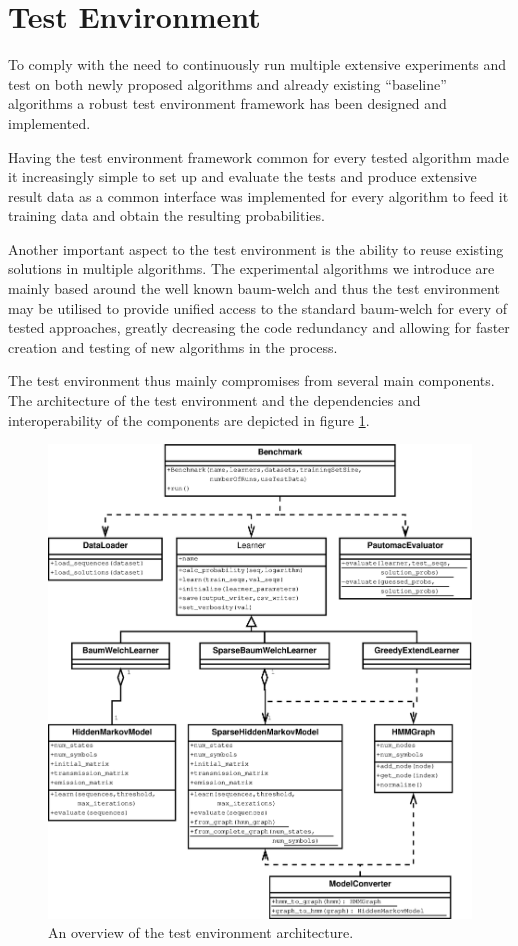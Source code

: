 \section{Test Environment}

To comply with the need to continuously run multiple extensive experiments and test on both newly proposed algorithms and already existing ``baseline'' algorithms a robust test environment framework has been designed and implemented.

Having the test environment framework common for every tested algorithm made it increasingly simple to set up and evaluate the tests and produce extensive result data as a common interface was implemented for every algorithm to feed it training data and obtain the resulting probabilities.

Another important aspect to the test environment is the ability to reuse existing solutions in multiple algorithms. The experimental algorithms we introduce are mainly based around the well known \gls{baum-welch} and thus the test environment may be utilised to provide unified access to the standard \gls{baum-welch} for every of tested approaches, greatly decreasing the code redundancy and allowing for faster creation and testing of new algorithms in the process.

The test environment thus mainly compromises from several main components. The architecture of the test environment and the dependencies and interoperability of the components are depicted in figure \ref{fig:testenvironment}.

\begin{figure}[!htb]
\centering
\includegraphics[scale=.4]{pictures/test-environment-overview.eps}
\caption{An overview of the test environment architecture.}
\label{fig:testenvironment}
\end{figure}

